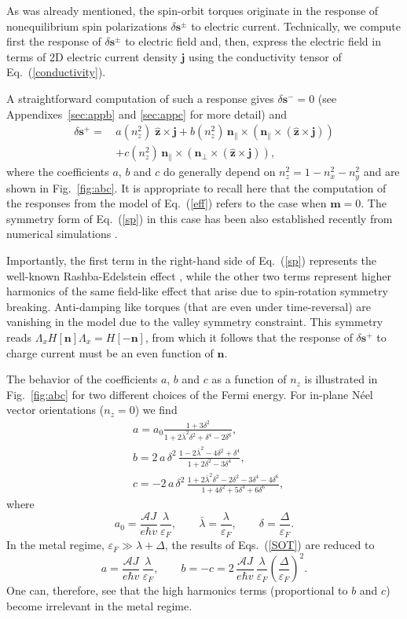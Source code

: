 \documentclass[%
  twocolumn,
  aps,
  prb,
  amsmath,
  amssymb,
  superscriptaddress,
  nofootinbib,
  floatfix
]{revtex4-1}
\newcommand{\be}{\begin{equation}}
\newcommand{\e}{\end{equation}}
\newcommand{\beml}{\begin{subequations}}
\newcommand{\eml}{\end{subequations}}
\newcommand{\lt}{\left}
\newcommand{\rt}{\right}
\newcommand{\n}{\nonumber}
\newcommand{\ep}{\varepsilon}
\newcommand{\bb}{\boldsymbol}
\newcommand{\0}{^{\phantom{\dagger}}}
\begin{document}
As was already mentioned, the spin-orbit torques originate in the response of nonequilibrium spin polarizations $\delta\bb{s}^\pm$ to electric current. Technically, we compute first the response of $\delta\bb{s}^\pm$ to electric field and, then, express the electric field in terms of 2D electric current density $\bb{j}$ using the conductivity tensor of Eq.~(\ref{conductivity}).

A straightforward computation of such a response gives $\delta\bb{s}^-=0$ (see Appendixes~\ref{sec:appb} and \ref{sec:appc} for more detail) and 
\begin{align}
\label{sp}
\delta\bb{s}^+= \,&a(n_z^2)\;\hat{\bb{z}}\times \bb{j} + b(n_z^2)\, \bb{n}_\parallel\times(\bb{n}_\parallel\times \lt(\hat{\bb{z}}\times \bb{j}\rt)) \n\\
&+ c(n_z^2)\, \bb{n}_\parallel \times(\bb{n}_\perp\times \lt(\hat{\bb{z}}\times \bb{j}\rt)),
\end{align}
where the coefficients $a$, $b$ and $c$ do generally depend on $n_z^2=1-n_x^2-n_y^2$ and are shown in Fig.~\ref{fig:abc}. 
It is appropriate to recall here that the computation of the responses from the model of Eq.~(\ref{eff}) refers to the case when $\bb{m}=0$. The symmetry form of Eq.~(\ref{sp}) in this case has been also established recently from numerical simulations \cite{Sumit2019}.

Importantly, the first term in the right-hand side of Eq.~(\ref{sp}) represents the well-known Rashba-Edelstein effect \cite{Edelstein1990}, while the other two terms represent higher harmonics of the same field-like effect that arise due to spin-rotation symmetry breaking. Anti-damping like torques (that are even under time-reversal) are vanishing in the model due to the valley symmetry constraint. This symmetry reads $\Lambda_x H[\bb{n}] \Lambda_x = H[-\bb{n}]$, from which it follows that the response of $\delta\bb{s}^+$ to charge current must be an even function of $\bb{n}$. 

The behavior of the coefficients $a$, $b$ and $c$ as a function of $n_z$ is illustrated in Fig.~\ref{fig:abc} for two different choices of the Fermi energy. For in-plane N\'eel vector orientations ($n_z=0$) we find 
\beml
\label{SOT}
\begin{align}
&a=a_0 \frac{1+3\delta^2}{1+2\bar{\lambda}^2\delta^2+\delta^4-2\delta^6},\\
&b=2\, a\,\delta^2\,\frac{1-2\bar{\lambda}^2-4\delta^2+\delta^4}{1+2\delta^2-3\delta^4},\\
&c=-2\, a\,\delta^2\,\frac{1+2\bar{\lambda}^2\delta^2-2\delta^2-3\delta^4-4\delta^6}{1+4\delta^2+5\delta^4+6\delta^6},
\end{align}
\eml
where
\be
a_0=\frac{\mathcal{A}J}{e\hbar v}\,\frac{\lambda}{\ep_F}, \qquad \bar{\lambda}=\frac{\lambda}{\ep_F},\qquad\delta=\frac{\Delta}{\ep_F}.
\e
In the metal regime, $\ep_F\gg \lambda+\Delta$, the results of Eqs.~(\ref{SOT}) are reduced to 
\be
\label{SOTlargeE}
a=\frac{\mathcal{A}J}{e\hbar v}\,\frac{\lambda}{\ep_F}, \qquad b=-c=2\,\frac{\mathcal{A}J}{e\hbar v}\,\frac{\lambda}{\ep_F}
\lt(\frac{\Delta}{\ep_F}\rt)^2.
\e
One can, therefore, see that the high harmonics terms (proportional to $b$ and $c$) become irrelevant in the metal regime.  
\end{document}
